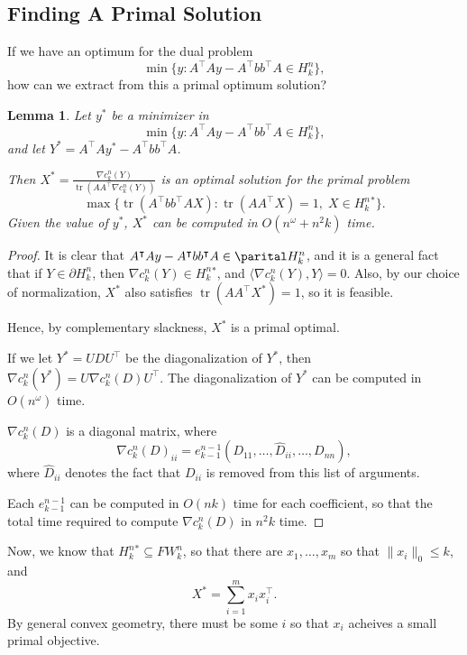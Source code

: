 \documentclass[a4paper]{article}
\newtheorem{lemma}{Lemma}
\DeclareMathOperator*{\tr}{tr}
\begin{document}
\subsection{Finding A Primal Solution}
If we have an optimum for the dual problem
\[
    \min \{y : A^{\intercal}A y - A^{\intercal}bb^{\intercal}A \in H^n_k\},
\]
how can we extract from this a primal optimum solution? 

\begin{lemma}
    Let $y^*$ be a minimizer in 
\[
    \min \{y : A^{\intercal}A y - A^{\intercal}bb^{\intercal}A \in H^n_k\},
\]
and let $Y^* = A^{\intercal}A y^* - A^{\intercal}bb^{\intercal}A$.

Then $X^* = \frac{\nabla c_k^n(Y)}{\tr(AA^{\intercal}\nabla c_k^n(Y))}$ is an optimal solution for the primal problem
\[
    \max \{\tr(A^{\intercal}bb^{\intercal}A X) : \tr(AA^{\intercal} X) = 1, \; X \in H^n_k^*\}.
\]
Given the value of $y^*$, $X^*$ can be computed in $O(n^{\omega} + n^2k)$ time.
\end{lemma}
\begin{proof}
    It is clear that $A^{\intercal}A y - A^{\intercal}bb^{\intercal}A \in \parital H^n_k$, and it is a general fact that if $Y \in \partial H^n_k$, then $\nabla c_k^n(Y) \in H^n_k^*$, and $\langle \nabla c_k^n(Y), Y \rangle = 0$.
    Also, by our choice of normalization, $X^*$ also satisfies $\tr(AA^{\intercal}X^*) = 1$, so it is feasible.

    Hence, by complementary slackness, $X^*$ is a primal optimal.

    If we let $Y^* = UDU^{\intercal}$ be the diagonalization of $Y^*$, then $\nabla c_k^n(Y^*) = U\nabla c_k^n(D)U^{\intercal}$.
    The diagonalization of $Y^*$ can be computed in $O(n^{\omega})$ time.
    
    $\nabla c_k^n(D) $ is a diagonal matrix, where
    \[
        \nabla c_k^n(D)_{ii} = e_{k-1}^{n-1}(D_{11}, \dots, \hat{D}_{ii}, \dots, D_{nn}),
    \]
    where $\hat{D}_{ii}$ denotes the fact that $D_{ii}$ is removed from this list of arguments.
    
    Each $e_{k-1}^{n-1}$ can be computed in $O(nk)$ time for each coefficient, so that the total time required to compute $\nabla c_k^n(D)$ in $n^2k$ time.

\end{proof}
Now, we know that $H^n_k^* \subseteq FW^n_k$, so that there are $x_1, \dots, x_m$ so that $\|x_i\|_0 \le k$, and
\[
    X^* = \sum_{i=1}^m x_ix_i^{\intercal}.
\]
By general convex geometry, there must be some $i$ so that $x_i$ acheives a small primal objective.
\end{document}
